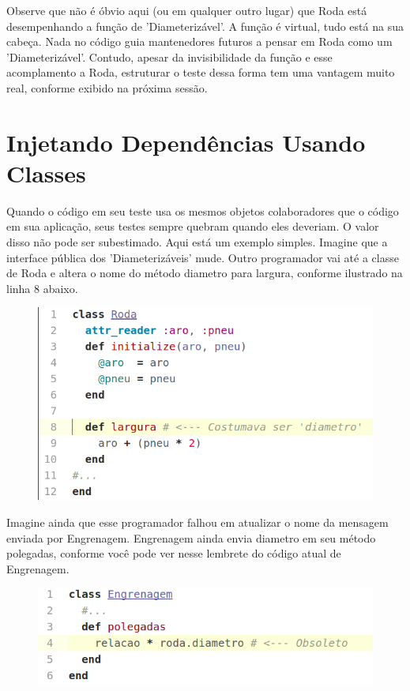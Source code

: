 Observe que não é óbvio aqui (ou em qualquer outro lugar) que Roda está
desempenhando a função de 'Diameterizável'. A função é virtual, tudo está na sua
cabeça. Nada no código guia mantenedores futuros a pensar em Roda como um
'Diameterizável'. Contudo, apesar da invisibilidade da função e esse
acomplamento a Roda, estruturar o teste dessa forma tem uma vantagem muito real,
conforme exibido na próxima sessão.

\section{Injetando Dependências Usando Classes}

Quando o código em seu teste usa os mesmos objetos colaboradores que o código em
sua aplicação, seus testes sempre quebram quando eles deveriam. O valor disso
não pode ser subestimado.
Aqui está um exemplo simples. Imagine que a interface pública dos
'Diameterizáveis' mude. Outro programador vai até a classe de Roda e altera o
nome do método diametro para largura, conforme ilustrado na linha 8 abaixo.

\begin{figure}[!htbp]
  \center
  \includegraphics[scale=0.50]{imagens/codigo_pag_207_a.png}
  \label{img:codigo_pag_207_a}
\end{figure}

Imagine ainda que esse programador falhou em atualizar o nome da mensagem
enviada por Engrenagem. Engrenagem ainda envia diametro em seu método polegadas,
conforme você pode ver nesse lembrete do código atual de Engrenagem.

\begin{figure}[!htbp]
  \center
  \includegraphics[scale=0.50]{imagens/codigo_pag_207_b.png}
  \label{img:codigo_pag_207_b}
\end{figure}
